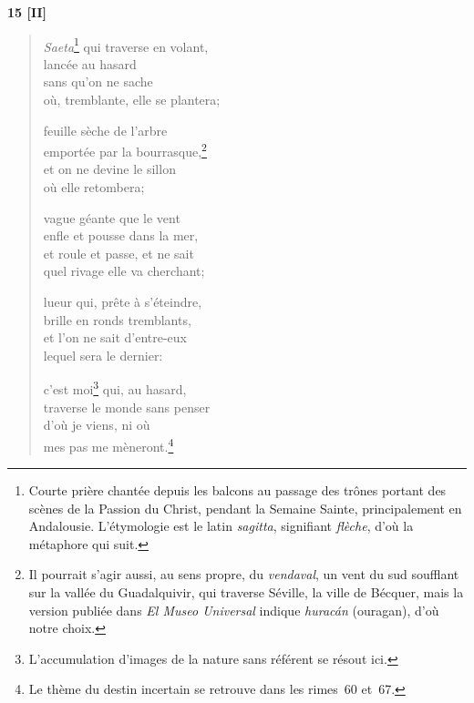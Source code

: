 \bigskip\bigskip\bigskip\bigskip

\pagebreak

\begin{center}
  \textbf{15 [II]}
\end{center}

\begin{verse}
  \emph{Saeta}\footnote{Courte prière chantée
  depuis les balcons au passage des trônes portant des scènes de la
  Passion du Christ, pendant la Semaine Sainte, principalement en
  Andalousie. L'étymologie est le latin \emph{sagitta},
  signifiant \emph{flèche}, d'où la métaphore qui suit.} qui traverse
  en volant, \\
  lancée au hasard \\
  sans qu'on ne sache \\
  où, tremblante, elle se plantera;

  feuille sèche de l'arbre \\
  emportée par la bourrasque,\footnote{Il pourrait s'agir aussi, au
  sens propre, du \emph{vendaval}, un vent du sud soufflant sur la
  vallée du Guadalquivir, qui traverse Séville, la ville de Bécquer,
  mais la version publiée dans \emph{El Museo Universal} indique
  \emph{huracán} (ouragan), d'où notre choix.} \\
  et on ne devine le sillon \\
  où elle retombera;

  vague géante que le vent \\
  enfle et pousse dans la mer, \\
  et roule et passe, et ne sait \\
  quel rivage elle va cherchant;

  lueur qui, prête à s'éteindre, \\
  brille en ronds tremblants, \\
  et l'on ne sait d'entre-eux \\
  lequel sera le dernier:

  c'est moi\footnote{L'accumulation d'images de la nature sans
  référent se résout ici.} qui, au hasard, \\
  traverse le monde sans penser \\
  d'où je viens, ni où \\
  mes pas me mèneront.\footnote{Le thème du destin incertain se
  retrouve dans les rimes~60 et~67.}
\end{verse}

